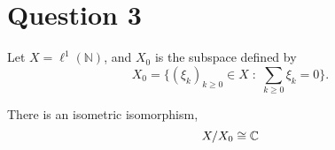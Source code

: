 \documentclass{unswmaths}
\begin{document}
\section*{Question 3}
Let $X = \ell^1(\mathbb{N})$, and $X_0$ is the subspace defined by
\begin{equation*}
    X_0 = \{ (\xi_k)_{k\geq 0} \in X \;:\;\sum_{k\geq 0} \xi_k = 0\}.
\end{equation*}
\begin{theorem}
    There is an isometric isomorphism,
    \begin{equation*}
        X/X_0 \cong \mathbb{C}
    \end{equation*}
\end{theorem}
%    
%    
%    
\end{document}
